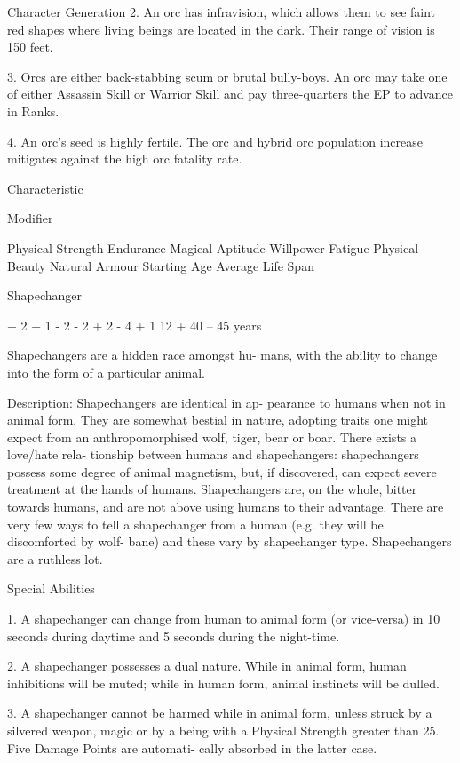 \begin{Chapter}{Character Generation}
2. An orc has infravision, which allows them to see 
faint red shapes where  living beings are located in 
the dark. Their range of vision is 150 feet. 

3.  Orcs  are  either  back-stabbing  scum  or  brutal 
bully-boys. An orc may take one of either Assassin 
Skill or Warrior Skill and pay three-quarters the EP 
to advance in Ranks. 

4.  An orc’s seed is highly fertile.  The orc and hybrid orc
population increase mitigates against the high orc fatality rate.

Characteristic  

Modifier 

Physical Strength  
Endurance  
Magical Aptitude  
Willpower  
Fatigue  
Physical Beauty  
Natural Armour  
Starting Age  
Average Life Span 

Shapechanger 

+ 2 
+ 1 
- 2 
- 2 
+ 2 
- 4 
+ 1 
12 +  
40 – 45 years 

Shapechangers  are  a  hidden  race  amongst  hu-
mans, with the ability to change into the form of 
a particular animal. 

Description:  Shapechangers  are  identical  in  ap-
pearance to humans when not in animal form. They 
are somewhat bestial in nature, adopting traits one 
might  expect  from  an  anthropomorphised  wolf, 
tiger,  bear  or  boar.  There  exists  a  love/hate  rela-
tionship  between  humans  and  shapechangers: 
shapechangers  possess  some  degree  of  animal 
magnetism,  but,  if  discovered,  can  expect  severe 
treatment  at  the  hands  of  humans.  Shapechangers 
are,  on  the  whole,  bitter  towards  humans,  and  are 
not  above  using  humans  to  their  advantage.  There 
are  very  few  ways  to  tell  a  shapechanger  from  a 
human  (e.g.  they  will  be  discomforted  by  wolf-
bane)  and  these  vary  by  shapechanger  type. 
Shapechangers are a ruthless lot. 

Special Abilities 

1.  A  shapechanger  can  change  from  human  to 
animal  form  (or  vice-versa)  in  10  seconds  during 
daytime and 5 seconds during the night-time. 

2.  A  shapechanger  possesses  a  dual  nature.  While 
in  animal  form,  human  inhibitions  will  be  muted; 
while  in  human  form,  animal  instincts  will  be 
dulled. 

3.  A  shapechanger  cannot  be  harmed  while  in 
animal  form,  unless  struck  by  a  silvered  weapon, 
magic  or  by  a  being  with  a  Physical  Strength 
greater than 25. Five Damage Points are automati-
cally absorbed in the latter case. 


\end{Chapter}
